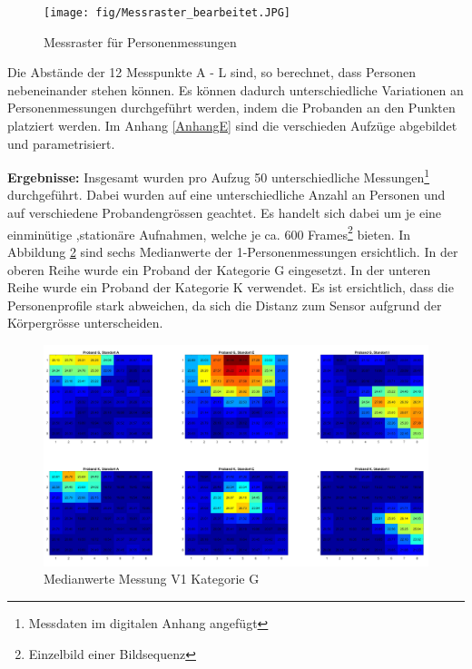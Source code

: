\begin{figure}[H]
	\centering
	\texttt{[image: fig/Messraster\_bearbeitet.JPG]}
	\caption[Messraster für Personenmessungen]{Messraster für Personenmessungen}
	\label{fig:Messraster}
\end{figure}

Die Abstände der 12 Messpunkte A - L sind, so berechnet, dass Personen nebeneinander stehen können. Es können dadurch unterschiedliche Variationen an Personenmessungen durchgeführt werden, indem die Probanden an den Punkten platziert werden. Im Anhang \ref{AnhangE} sind die verschieden Aufzüge abgebildet und parametrisiert.

\newpage

\textbf{Ergebnisse:} Insgesamt wurden pro Aufzug 50 unterschiedliche Messungen\footnote[21]{Messdaten im digitalen Anhang angefügt} durchgeführt. Dabei wurden auf eine unterschiedliche Anzahl an Personen und auf verschiedene Probandengrössen geachtet. Es handelt sich dabei um je eine einminütige ,stationäre Aufnahmen, welche je ca. 600 Frames\footnote[22]{Einzelbild einer Bildsequenz} bieten. In Abbildung \ref{fig:p1gallpositionsmean} sind sechs Medianwerte der 1-Personenmessungen ersichtlich. In der oberen Reihe wurde ein Proband der Kategorie G eingesetzt. In der unteren Reihe wurde ein Proband der Kategorie K verwendet. Es ist ersichtlich, dass die Personenprofile stark abweichen, da sich die Distanz zum Sensor aufgrund der Körpergrösse unterscheiden.

\begin{figure}[H]
	\centering
	\includegraphics[width=1.0\textwidth]{fig/p1_k_g_aei.jpg}
	\caption[Medianwerte Messung V1 Kategorie G]{Medianwerte Messung V1 Kategorie G}
	\label{fig:p1gallpositionsmean}
\end{figure}

